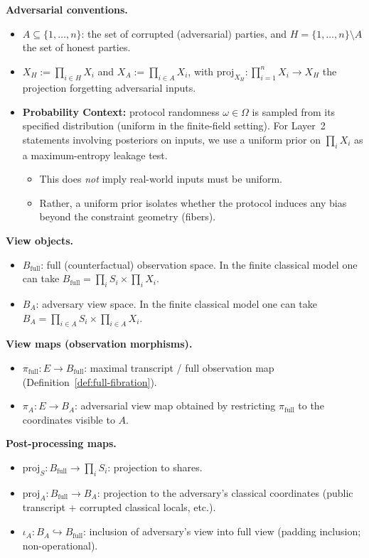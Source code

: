\documentclass[11pt,a4paper]{article}
\theoremstyle{definition}
\theoremstyle{plain}
\begin{document}
\textbf{Adversarial conventions.}
\begin{itemize}
    \item $A \subseteq \{1, \ldots, n\}$: the set of corrupted (adversarial) parties, and $H = \{1, \ldots, n\} \setminus A$ the set of honest parties.
    \item $X_H := \prod_{i \in H} X_i$ and $X_A := \prod_{i \in A} X_i$, with $\mathrm{proj}_{X_H}: \prod_{i=1}^n X_i \to X_H$ the projection forgetting adversarial inputs.
    \item \textbf{Probability Context:} protocol randomness $\omega\in\Omega$ is sampled from its specified distribution (uniform in the finite-field setting). For Layer~2 statements involving posteriors on inputs, we use a uniform prior on $\prod_i X_i$ as a maximum-entropy leakage test.
    \begin{itemize}
        \item This does \emph{not} imply real-world inputs must be uniform.
        \item Rather, a uniform prior isolates whether the protocol induces any bias beyond the constraint geometry (fibers).
    \end{itemize}
\end{itemize}

\textbf{View objects.}
\begin{itemize}
    \item $B_{\mathrm{full}}$: full (counterfactual) observation space. In the finite classical model one can take $B_{\mathrm{full}}=\prod_i S_i\times \prod_i X_i$.
    \item $B_A$: adversary view space. In the finite classical model one can take $B_A=\prod_{i\in A}S_i\times \prod_{i\in A}X_i$.
\end{itemize}

\textbf{View maps (observation morphisms).}
\begin{itemize}
    \item $\pi_{\mathrm{full}}: E \to B_{\mathrm{full}}$: maximal transcript / full observation map (Definition~\ref{def:full-fibration}).
    \item $\pi_A:E\to B_A$: adversarial view map obtained by restricting $\pi_{\mathrm{full}}$ to the coordinates visible to $A$.
\end{itemize}

\textbf{Post-processing maps.}
\begin{itemize}
    \item $\mathrm{proj}_S: B_{\mathrm{full}} \to \prod_i S_i$: projection to shares.
    \item $\mathrm{proj}_A: B_{\mathrm{full}} \to B_A$: projection to the adversary's classical coordinates (public transcript + corrupted classical locals, etc.).
    \item $\iota_A: B_A \hookrightarrow B_{\mathrm{full}}$: inclusion of adversary's view into full view (padding inclusion; non-operational).
\end{itemize}
\end{document}
